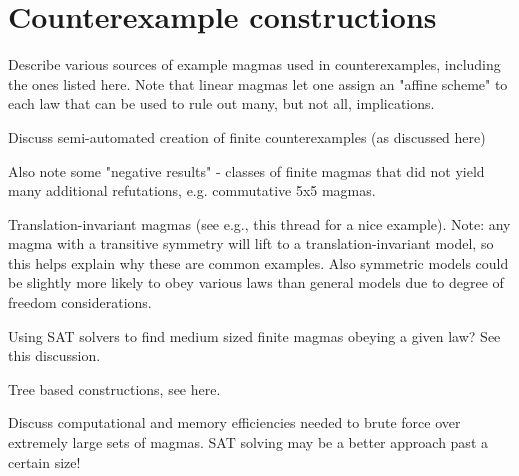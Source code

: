 \section{Counterexample constructions}


Describe various sources of example magmas used in counterexamples, including the ones listed here. Note that linear magmas let one assign an "affine scheme" to each law that can be used to rule out many, but not all, implications.

Discuss semi-automated creation of finite counterexamples (as discussed here)

Also note some "negative results" - classes of finite magmas that did not yield many additional refutations, e.g. commutative 5x5 magmas.

Translation-invariant magmas (see e.g., this thread for a nice example). Note: any magma with a transitive symmetry will lift to a translation-invariant model, so this helps explain why these are common examples. Also symmetric models could be slightly more likely to obey various laws than general models due to degree of freedom considerations.

Using SAT solvers to find medium sized finite magmas obeying a given law? See this discussion.

Tree based constructions, see here.

Discuss computational and memory efficiencies needed to brute force over extremely large sets of magmas. SAT solving may be a better approach past a certain size!
